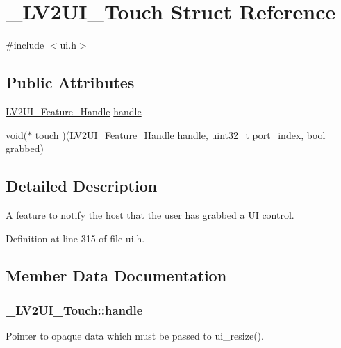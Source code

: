 \hypertarget{struct___l_v2_u_i___touch}{}\section{\+\_\+\+L\+V2\+U\+I\+\_\+\+Touch Struct Reference}
\label{struct___l_v2_u_i___touch}


{\ttfamily \#include $<$ui.\+h$>$}

\subsection*{Public Attributes}
\begin{DoxyCompactItemize}
\item 
\hyperlink{ui_8h_aee1f066da7d217c82bafa46bccbfde94}{L\+V2\+U\+I\+\_\+\+Feature\+\_\+\+Handle} \hyperlink{struct___l_v2_u_i___touch_a702bb94df7eb7c409265149196b8a8be}{handle}
\item 
\hyperlink{sound_8c_ae35f5844602719cf66324f4de2a658b3}{void}($\ast$ \hyperlink{struct___l_v2_u_i___touch_ac2f0b9f69ebb024c370a59ea5e89caef}{touch} )(\hyperlink{ui_8h_aee1f066da7d217c82bafa46bccbfde94}{L\+V2\+U\+I\+\_\+\+Feature\+\_\+\+Handle} \hyperlink{struct___l_v2_u_i___touch_a702bb94df7eb7c409265149196b8a8be}{handle}, \hyperlink{lib-src_2ffmpeg_2win32_2stdint_8h_a6eb1e68cc391dd753bc8ce896dbb8315}{uint32\+\_\+t} port\+\_\+index, \hyperlink{mac_2config_2i386_2lib-src_2libsoxr_2soxr-config_8h_abb452686968e48b67397da5f97445f5b}{bool} grabbed)
\end{DoxyCompactItemize}


\subsection{Detailed Description}
A feature to notify the host that the user has grabbed a UI control. 

Definition at line 315 of file ui.\+h.



\subsection{Member Data Documentation}
\subsubsection[{\texorpdfstring{handle}{handle}}]{ \+\_\+\+L\+V2\+U\+I\+\_\+\+Touch\+::handle}\hypertarget{struct___l_v2_u_i___touch_a702bb94df7eb7c409265149196b8a8be}{}\label{struct___l_v2_u_i___touch_a702bb94df7eb7c409265149196b8a8be}
Pointer to opaque data which must be passed to ui\+\_\+resize(). 

